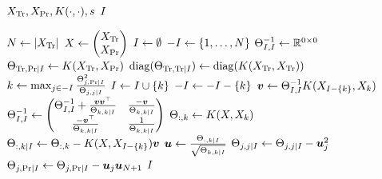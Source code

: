 \begin{algorithmic}[1]
  \REQUIRE \( X_{\text{Tr}}, X_{\text{Pr}}, K(\cdot, \cdot), s \)
  \ENSURE \( I \)

  \STATE \( N \gets \lvert X_{\text{Tr}}\rvert \)
  \STATE \(
    X \gets
    \begin{pmatrix}
      X_{\text{Tr}} \\
      X_{\text{Pr}}
    \end{pmatrix}
  \)
  \STATE \( I \gets \emptyset \)
  \STATE \( -I \gets \{ 1, \dotsc, N \} \)
  \STATE \( \Theta_{I, I}^{-1} \gets \mathbb{R}^{0 \times 0} \)
  \STATE \(
    \Theta_{\text{Tr}, \text{Pr} \mid I} \gets
    K(X_{\text{Tr}}, X_{\text{Pr}})
  \)
  \STATE \(
    \operatorname{diag}(\Theta_{\text{Tr}, \text{Tr} \mid I}) \gets
    \operatorname{diag}(K(X_{\text{Tr}}, X_{\text{Tr}}))
  \)
    \STATE \(
      k \gets \max_{j \in -I}
      \frac{\Theta_{j, \text{Pr} \mid I}^2}{\Theta_{j, j \mid I}}
    \)
    \STATE \( I \gets I \cup \{ k \} \)
    \STATE \( -I \gets -I - \{ k \} \)
    \STATE \( \bm{v} \gets \Theta_{I, I}^{-1} K(X_{I - \{ k \}}, X_k) \)
    \STATE \(
      \Theta_{I, I}^{-1} \gets
      \begin{pmatrix}
        \Theta_{I, I}^{-1} + \frac{\bm{v} \bm{v}^{\top}}{\Theta_{k, k \mid I}} &
        \frac{-\bm{v}}{\Theta_{k, k \mid I}} \\
        \frac{-\bm{v}^{\top}}{\Theta_{k, k \mid I}} &
        \frac{1}{\Theta_{k, k \mid I}}
      \end{pmatrix}
    \)
    \STATE \( \Theta_{:, k} \gets K(X, X_k) \)
    \STATE \(
      \Theta_{:, k \mid I} \gets \Theta_{:, k} -
      K(X, X_{I - \{ k \}}) \bm{v}
    \)
    \STATE \(
      \bm{u} \gets \frac{\Theta_{:, k \mid I}}{\sqrt{\Theta_{k, k \mid I}}}
    \)
      \STATE \(
        \Theta_{j, j \mid I} \gets
        \Theta_{j, j \mid I} -
        \bm{u}_j^2
      \)
      \STATE \(
        \Theta_{j, \text{Pr} \mid I} \gets
        \Theta_{j, \text{Pr} \mid I} -
        \bm{u}_j \bm{u}_{N + 1}
      \)
    \ENDFOR
  \ENDWHILE
  \RETURN \( I \)
\end{algorithmic}
